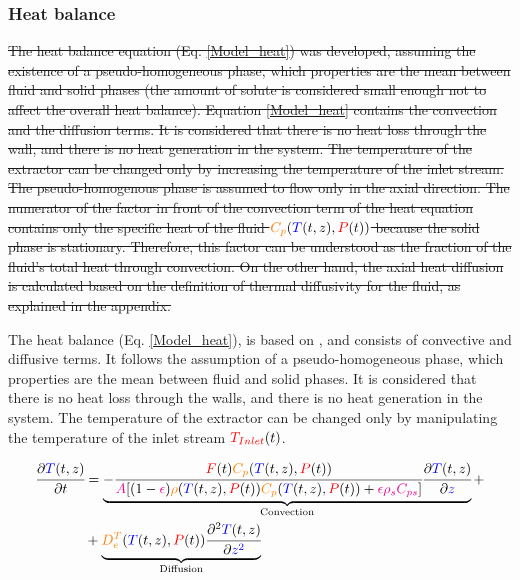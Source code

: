 \documentclass[../Article_Model_Parameters.tex]{subfiles}
\begin{document}
			\subsubsection{Heat balance} \label{CH: heat_balance}
			\sout{The heat balance equation (Eq.  \ref{Model_heat}) was developed, assuming the existence of a pseudo-homogeneous phase, which properties are the mean between fluid and solid phases (the amount of solute is considered small enough not to affect the overall heat balance). Equation \ref{Model_heat} contains the convection and the diffusion terms. It is considered that there is no heat loss through the wall, and there is no heat generation in the system. The temperature of the extractor can be changed only by increasing the temperature of the inlet stream. The pseudo-homogenous phase is assumed to flow only in the axial direction. 
			The numerator of the factor in front of the convection term of the heat equation contains only the specific heat of the fluid ${\color{orange}C_p}({\color{blue}T}(t,z),{\color{red}P}(t))$ because the solid phase is stationary. Therefore, this factor can be understood as the fraction of the fluid's total heat through convection. On the other hand, the axial heat diffusion is calculated based on the definition of thermal diffusivity for the fluid, as explained in the appendix. }
			
			{\color{blue} The heat balance (Eq. \ref{Model_heat}), is based on \citet{Srinivasan2012}, and consists of convective and diffusive terms. It follows the assumption of a pseudo-homogeneous phase, which properties are the mean between fluid and solid phases. It is considered that there is no heat loss through the walls, and there is no heat generation in the system. The temperature of the extractor can be changed only by manipulating the temperature of the inlet stream ${\color{red}T_{Inlet}}(t)$.
			}
			
			{\footnotesize
				\begin{equation} \label{Model_heat}
					\begin{split}
						\cfrac{\partial {\color{blue}T}(t,z)}{\partial t} &= 
						\underbrace{ -\cfrac{{\color{red}F}(t) {\color{orange}C_p}({\color{blue}T}(t,z),{\color{red}P}(t))}{{\color{magenta}A} 	[(1-{\color{magenta}\epsilon}){\color{orange}\rho}({\color{blue}T}(t,z),{\color{red}P}(t)) {\color{orange}C_p} ({\color{blue}T}(t,z),{\color{red}P}(t)) + {\color{magenta} \epsilon \rho_s C_{ps} } ]} \cfrac{\partial {\color{blue}T}(t,z)}{\partial {\color{blue}z}}  }_{\text{Convection}} + \\
						& + \underbrace{ {\color{orange}D^T_e}({\color{blue}T}(t,z),{\color{red}P}(t)) \cfrac{\partial^2 {\color{blue}T}(t,z)}{\partial {\color{blue}z^2}} }_{\text{Diffusion}}
					\end{split}
			\end{equation} }
			
\end{document}
